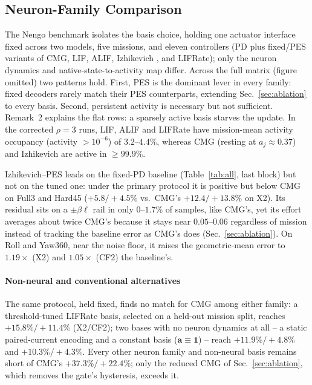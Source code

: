 \documentclass[letterpaper, 10 pt, conference]{ieeeconf}
\begin{document}
\subsection{Neuron-Family Comparison}
\label{sec:family}

The Nengo benchmark isolates the basis choice, holding one actuator interface fixed across two models, five missions, and eleven controllers (PD plus fixed/PES variants of CMG, LIF, ALIF, Izhikevich \cite{izhikevich2003}, and LIFRate); only the neuron dynamics and native-state-to-activity map differ. Across the full matrix (figure omitted) two patterns hold. First, PES is the dominant lever in every family: fixed decoders rarely match their PES counterparts, extending Sec.~\ref{sec:ablation} to every basis. Second, persistent activity is necessary but not sufficient. Remark~2 explains the flat rows: a sparsely active basis starves the update. In the corrected $\rho=3$ runs, LIF, ALIF and LIFRate have mission-mean activity occupancy (activity $>10^{-6}$) of $3.2$--$4.4\%$, whereas CMG (resting at $a_j\approx0.37$) and Izhikevich are active in ${\ge}99.9\%$.

Izhikevich--PES leads on the fixed-PD baseline (Table~\ref{tab:all}, last block) but not on the tuned one: under the primary protocol it is positive but below CMG on Full3 and Hard45 ($+5.8/+4.5\%$ vs.\ CMG's $+12.4/+13.8\%$ on X2). Its residual sits on a $\pm\beta\ell$ rail in only $0$--$1.7\%$ of samples, like CMG's, yet its effort averages about twice CMG's because it stays near $0.05$--$0.06$ regardless of mission instead of tracking the baseline error as CMG's does (Sec.~\ref{sec:ablation}). On Roll and Yaw360, near the noise floor, it raises the geometric-mean error to $1.19\times$ (X2) and $1.05\times$ (CF2) the baseline's.

\paragraph{Non-neural and conventional alternatives} The same protocol, held fixed, finds no match for CMG among either family: a threshold-tuned LIFRate basis, selected on a held-out mission split, reaches $+15.8\%/+11.4\%$ (X2/CF2); two bases with no neuron dynamics at all -- a static paired-current encoding and a constant basis ($\bm a\equiv\bm1$) -- reach $+11.9\%/+4.8\%$ and $+10.3\%/+4.3\%$. Every other neuron family and non-neural basis remains short of CMG's $+37.3\%/+22.4\%$; only the reduced CMG of Sec.~\ref{sec:ablation}, which removes the gate's hysteresis, exceeds it.
\end{document}

